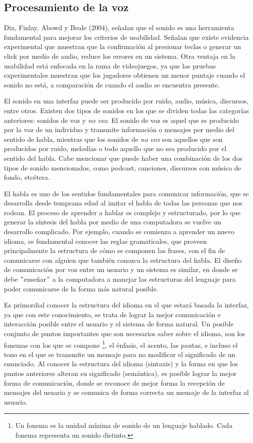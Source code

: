 \subsection{Procesamiento de la voz}
\label{ProcesamientoVozCap3}

Dix, Finlay, Abowd y Beale (2004), señalan que el sonido es una herramienta fundamental para mejorar los criterios de usabilidad. Señalan que existe evidencia experimental que muestran que la confirmación al presionar teclas o generar un click por medio de audio, reduce los errores en un sistema. Otra ventaja en la usabilidad está enfocada en la rama de videojuegos, ya que las pruebas experimentales muestran que los jugadores obtienen un menor puntaje cuando el sonido no está, a comparación de cuando el audio se encuentra presente. 

El sonido en una interfaz puede ser producido por ruido, audio, música, discursos, entre otros. Existen dos tipos de sonidos en los que se dividen todas las categorías anteriores: sonidos de voz y \textit{no voz}. El sonido de voz es aquel que es producido por la voz de un individuo y transmite información o mensajes por medio del sentido de habla, mientras que los sonidos de \textit{no voz} son aquellos que son producidos por ruido, melodías o todo aquello que no sea producido por el sentido del habla. Cabe mencionar que puede haber una combinación de los dos tipos de sonido mencionados, como podcast, canciones, discursos con música de fondo, etcétera.

El habla es uno de los sentidos fundamentales para comunicar información, que se desarrolla desde temprana edad al imitar el habla de todas las personas que nos rodean. El proceso de aprender a hablar es complejo y estructurado, por lo que generar la síntesis del habla por medio de una computadora se vuelve un desarrollo complicado. Por ejemplo, cuando se comienza a aprender un nuevo idioma, es fundamental conocer las reglas gramaticales, que proveen principalmente la estructura de cómo se componen las frases, con el fin de comunicarse con alguien que también conozca la estructura del habla. El diseño de comunicación por voz entre un usuario y un sistema es similar, en donde se debe $"$enseñar$"$ a la computadora a manejar las estructuras del lenguaje para poder comunicarse de la forma más natural posible.

Es primordial conocer la estructura del idioma en el que estará basada la interfaz, ya que con este conocimiento, se trata de lograr la mejor comunicación e interacción posible entre el usuario y el sistema de forma natural. Un posible conjunto de puntos importantes que son necesarios saber sobre el idioma, son los fonemas con los que se compone \footnote{Un fonema es la unidad mínima de sonido de un lenguaje hablado. Cada fonema representa un sonido distinto.}, el énfasis, el acento, las pautas, e incluso el tono en el que se transmite un mensaje para no modificar el significado de un enunciado. Al conocer la estructura del idioma (sintaxis) y la forma en que los puntos anteriores alteran su significado (semántica), es posible lograr la mejor forma de comunicación, donde se reconoce de mejor forma la recepción de mensajes del usuario y se comunica de forma correcta un mensaje de la interfaz al usuario.

